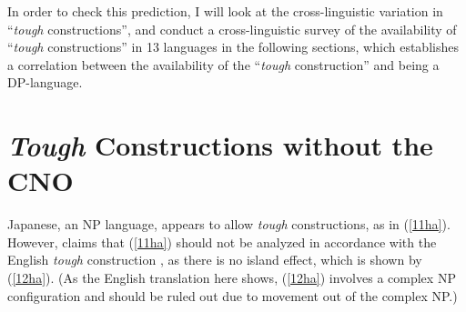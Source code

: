 \documentclass[output=paper,colorlinks,citecolor=brown,
]{langscibook}
\begin{document}
In order to check this prediction, I will look at the cross-linguistic variation in “\textit{tough} constructions”, and conduct a cross-linguistic survey of the availability of “\textit{tough} constructions” in 13 languages in the following sections, which establishes a correlation between the availability of the “\textit{tough} construction” and being a DP-language.

\section{\textit{Tough} Constructions without the CNO}
Japanese, an NP language, appears to allow \textit{tough} constructions, as in (\ref{11ha}). However, \citet{takezawa1987} claims that (\ref{11ha}) should not be analyzed in accordance with the English \textit{tough} construction \citep{Chomsky1977}, as there is no island effect, which is shown by (\ref{12ha}). (As the English translation here shows, (\ref{12ha}) involves a complex NP configuration and should be ruled out due to movement out of the complex NP.) 
\end{document}
